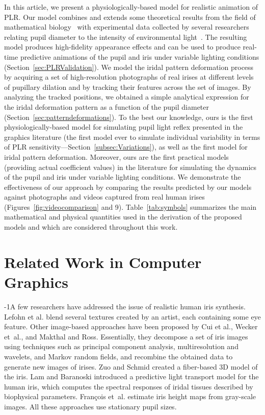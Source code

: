 \documentclass{acmtog} %
\begin{document}
In this article, we present a physiologically-based model for realistic
animation of PLR. Our model combines and extends some theoretical
results from the field of mathematical biology~\cite{CDFKMS-06} with
experimental data collected by several {researchers} relating pupil
diameter to the intensity of environmental
light~\cite{BCHH:Collewijn:1988}. The resulting model produces
high-fidelity appearance effects and can be used to produce real-time
predictive animations of the pupil and iris under variable lighting
conditions (Section~\ref{sec:PLRValidation}). We model the iridal
pattern deformation process by acquiring a set of high-resolution
photographs of real irises at different levels of pupillary dilation and
by tracking their features across the set of images. By analyzing the
tracked positions, we obtained a simple analytical expression for the
iridal deformation pattern as a function of the pupil diameter
(Section~\ref{sec:patterndeformations}). To the best our knowledge, ours
is the first physiologically-based model for simulating pupil light
reflex presented in the graphics literature (the first model ever to
simulate individual variability in terms of PLR
sensitivity---Section~\ref{subsec:Variations}), as well as the first
model for iridal pattern deformation. Moreover, ours are the first
practical models (providing actual coefficient values) in the literature
for simulating the dynamics of the pupil and iris under variable
lighting conditions. We demonstrate the effectiveness of our approach by
comparing the results predicted by our models against photographs and
videos captured from real human irises
(Figures~\ref{fig:videocomparison} and 9). Table~\ref{tab:symbols}
summarizes the main mathematical and physical quantities used in the
derivation of the proposed models and which are considered throughout
this work.


\section{Related Work in Computer Graphics}
\label{sec:relatedwork}
%
\looseness-1A few researchers have addressed the issue of realistic
human iris synthesis. Lefohn et al. blend several textures created by an
artist, each containing some eye feature. Other image-based approaches
have been proposed by Cui et al., Wecker et~al., and Makthal and Ross.
Essentially, they decompose a set of iris images using techniques such
as principal component analysis, multiresolution and wavelets, and
Markov random fields, and recombine the obtained data to generate new
images of irises. Zuo and Schmid created a fiber-based 3D model of the
iris. Lam and Baranoski introduced a predictive light transport model
for the human iris, which computes the spectral responses of iridal
tissues described by biophysical parameters. Fran\c{c}ois et~al.
estimate iris height maps from gray-scale images. All these approaches
use stationary pupil sizes.
\end{document}
